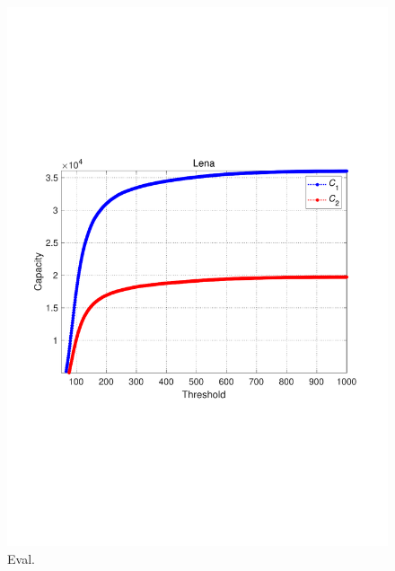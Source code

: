 \documentclass[review,3p,10pt,sort&compress]{elsarticle}
\begin{document}
\begin{figure}
{\begin{minipage}[t]{0.465\linewidth}
    \includegraphics[width=1\textwidth]{figures/CapLena.pdf}
    \end{minipage}
}
\centering
\caption{Eval.}
\label{Fig.Eval}
\end{figure}
\end{document}
